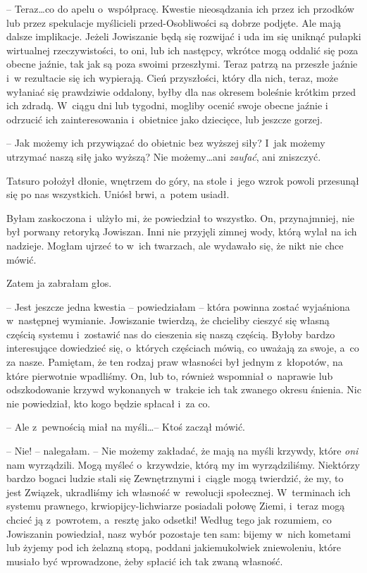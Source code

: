 \documentclass[oneside,polish,11pt,sfheadings]{mwbk}
\begin{document}
-- Teraz\ldots  co do apelu o~współpracę. Kwestie nieosądzania ich przez ich
przodków lub przez spekulacje myślicieli przed-Osobliwości są dobrze
podjęte. Ale mają dalsze implikacje. Jeżeli Jowiszanie będą się rozwijać
i uda im się uniknąć pułapki wirtualnej rzeczywistości, to oni, lub ich
następcy, wkrótce mogą oddalić się poza obecne jaźnie, tak jak są poza
swoimi przeszłymi. Teraz patrzą na przeszłe jaźnie i~w rezultacie się
ich wypierają. Cień przyszłości, który dla nich, teraz, może wyłaniać
się prawdziwie oddalony, byłby dla nas okresem boleśnie krótkim przed
ich zdradą. W~ciągu dni lub tygodni, mogliby ocenić swoje obecne jaźnie
i odrzucić ich zainteresowania i~obietnice jako dziecięce, lub jeszcze
gorzej.

-- Jak możemy ich przywiązać do obietnic bez wyższej siły? I~jak możemy
utrzymać naszą siłę jako wyższą? Nie możemy\ldots  ani \textit{zaufać}, ani
zniszczyć.

Tatsuro położył dłonie, wnętrzem do góry, na stole i~jego wzrok powoli
przesunął się po nas wszystkich. Uniósł brwi, a~potem usiadł.

Byłam zaskoczona i~ulżyło mi, że powiedział to wszystko. On,
przynajmniej, nie był porwany retoryką Jowiszan. Inni nie przyjęli
zimnej wody, którą wylał na ich nadzieje. Mogłam ujrzeć to w~ich
twarzach, ale wydawało się, że nikt nie chce mówić.

Zatem ja zabrałam głos.

-- Jest jeszcze jedna kwestia -- powiedziałam -- która powinna zostać
wyjaśniona w~następnej wymianie. Jowiszanie twierdzą, że chcieliby
cieszyć się własną częścią systemu i~zostawić nas do cieszenia się naszą
częścią. Byłoby bardzo interesujące dowiedzieć się, o~których częściach
mówią, co uważają za swoje, a~co za nasze. Pamiętam, że ten rodzaj praw
własności był jednym z~kłopotów, na które pierwotnie wpadliśmy. On, lub
to, również wspomniał o~naprawie lub odszkodowanie krzywd wykonanych w~trakcie ich tak zwanego okresu śnienia. Nic nie powiedział, kto kogo
będzie spłacał i~za co.

-- Ale z~pewnością miał na myśli\ldots  -- Ktoś zaczął mówić.

-- Nie! -- nalegałam. -- Nie możemy zakładać, że mają na myśli krzywdy,
które \textit{oni} nam wyrządzili. Mogą myśleć o~krzywdzie, którą my im
wyrządziliśmy. Niektórzy bardzo bogaci ludzie stali się Zewnętrznymi i~ciągle mogą twierdzić, że my, to jest Związek, ukradliśmy ich własność w~rewolucji społecznej. W~terminach ich systemu prawnego,
krwiopijcy-lichwiarze posiadali połowę Ziemi, i~teraz mogą chcieć ją z~powrotem, a~resztę jako odsetki! Według tego jak rozumiem, co Jowiszanin
powiedział, nasz wybór pozostaje ten sam: bijemy w~nich kometami lub
żyjemy pod ich żelazną stopą, poddani jakiemukolwiek zniewoleniu, które
musiało być wprowadzone, żeby spłacić ich tak zwaną własność.
\end{document}
